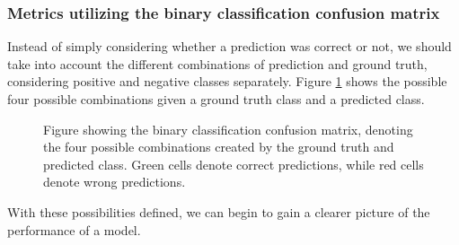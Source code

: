 \documentclass[UKenglish]{uiomasterthesis} %
\theoremstyle{definition}
\begin{document}
\subsubsection{Metrics utilizing the binary classification confusion matrix} \label{section:aurocfpr95}

Instead of simply considering whether a prediction was correct or not, we should take into account the different combinations of prediction and ground truth, considering positive and negative classes separately. Figure \ref{fig:confusion} shows the possible four possible combinations given a ground truth class and a predicted class.

\begin{figure}[H]
    \begin{center}


\end{center}
    \caption[Binary classification confusion matrix]{Figure showing the binary classification confusion matrix, denoting the four possible combinations created by the ground truth and predicted class. Green cells denote correct predictions, while red cells denote wrong predictions.}
\label{fig:confusion}
\end{figure}

With these possibilities defined, we can begin to gain a clearer picture of the performance of a model.
\end{document}
